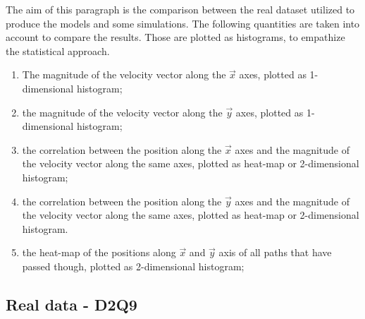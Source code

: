\documentclass[class=article, crop=false]{standalone}
\begin{document}
The aim of this paragraph is the comparison between the real dataset utilized to produce the models and some simulations.
The following quantities are taken into account to compare the results.
Those are plotted as histograms, to empathize the statistical approach.
\begin{enumerate}[label=(\roman*)]
\item The magnitude of the velocity vector along the $\vec x$ axes, plotted as 1-dimensional histogram;
\item the magnitude of the velocity vector along the $\vec y$ axes, plotted as 1-dimensional histogram;
\item the correlation between the position along the $\vec x$ axes and the magnitude of the velocity vector along the same axes, plotted as heat-map or 2-dimensional histogram;
\item the correlation between the position along the $\vec y$ axes and the magnitude of the velocity vector along the same axes, plotted as heat-map or 2-dimensional histogram.
\item the heat-map of the positions along $\vec x$ and $\vec y$ axis of all paths that have passed though, plotted as 2-dimensional histogram;
\end{enumerate}

\FloatBarrier
\subsection{Real data - D2Q9}
\end{document}
